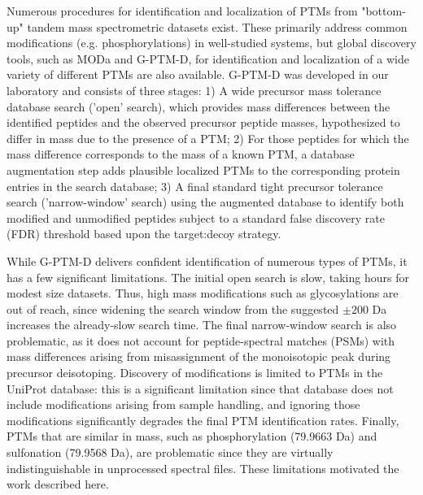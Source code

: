\documentclass[journal=jprobs,manuscript=article]{achemso}
\begin{document}
Numerous procedures for identification and localization of PTMs from "bottom-up" tandem mass spectrometric datasets exist.
These primarily address common modifications (e.g. phosphorylations) in well-studied systems, but global discovery tools, such as MODa\citep{Na_2011} and G-PTM-D\citep{Li_2016}, for identification and localization of a wide variety of different PTMs are also available.
G-PTM-D was developed in our laboratory and consists of three stages: 1) A wide precursor mass tolerance database search ('open' search)\citep{Chick_2015, Na_2011}, which provides mass differences between the identified peptides and the observed precursor peptide masses, hypothesized to differ in mass due to the presence of a PTM;
2) For those peptides for which the mass difference corresponds to the mass of a known PTM, a database augmentation step adds plausible localized PTMs to the corresponding protein entries in the search database;
3) A final standard tight precursor tolerance search ('narrow-window' search) using the augmented database to identify both modified and unmodified peptides subject to a standard false discovery rate (FDR) threshold based upon the target:decoy strategy\citep{Elias_2007}.

While G-PTM-D delivers confident identification of numerous types of PTMs, it has a few significant limitations.
The initial open search is slow, taking hours for modest size datasets.
Thus, high mass modifications such as glycosylations are out of reach, since widening the search window from the suggested $\pm 200$ Da increases the already-slow search time.
The final narrow-window search is also problematic, as it does not account for peptide-spectral matches (PSMs) with mass differences arising from misassignment of the monoisotopic peak during precursor deisotoping.
Discovery of modifications is limited to PTMs in the UniProt database: this is a significant limitation since that database does not include modifications arising from sample handling, and ignoring those modifications significantly degrades the final PTM identification rates.
Finally, PTMs that are similar in mass, such as phosphorylation (79.9663 Da) and sulfonation (79.9568 Da), are problematic since they are virtually indistinguishable in unprocessed spectral files.
These limitations motivated the work described here.
\end{document}
